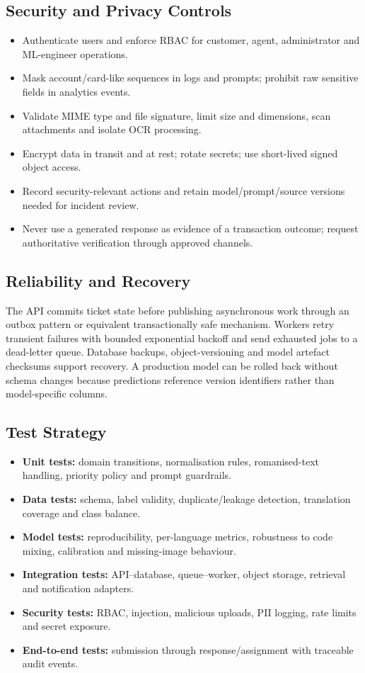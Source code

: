 \documentclass[10pt,letterpaper]{article}
\begin{document}
\subsection*{Security and Privacy Controls}
\begin{itemize}
  \item Authenticate users and enforce RBAC for customer, agent, administrator and ML-engineer operations.
  \item Mask account/card-like sequences in logs and prompts; prohibit raw sensitive fields in analytics events.
  \item Validate MIME type and file signature, limit size and dimensions, scan attachments and isolate OCR processing.
  \item Encrypt data in transit and at rest; rotate secrets; use short-lived signed object access.
  \item Record security-relevant actions and retain model/prompt/source versions needed for incident review.
  \item Never use a generated response as evidence of a transaction outcome; request authoritative verification through approved channels.
\end{itemize}

\subsection*{Reliability and Recovery}
The API commits ticket state before publishing asynchronous work through an outbox pattern or equivalent transactionally safe mechanism. Workers retry transient failures with bounded exponential backoff and send exhausted jobs to a dead-letter queue. Database backups, object-versioning and model artefact checksums support recovery. A production model can be rolled back without schema changes because predictions reference version identifiers rather than model-specific columns.

\subsection*{Test Strategy}
\begin{itemize}
  \item \textbf{Unit tests:} domain transitions, normalisation rules, romanised-text handling, priority policy and prompt guardrails.
  \item \textbf{Data tests:} schema, label validity, duplicate/leakage detection, translation coverage and class balance.
  \item \textbf{Model tests:} reproducibility, per-language metrics, robustness to code mixing, calibration and missing-image behaviour.
  \item \textbf{Integration tests:} API--database, queue--worker, object storage, retrieval and notification adapters.
  \item \textbf{Security tests:} RBAC, injection, malicious uploads, PII logging, rate limits and secret exposure.
  \item \textbf{End-to-end tests:} submission through response/assignment with traceable audit events.
\end{itemize}
\end{document}
